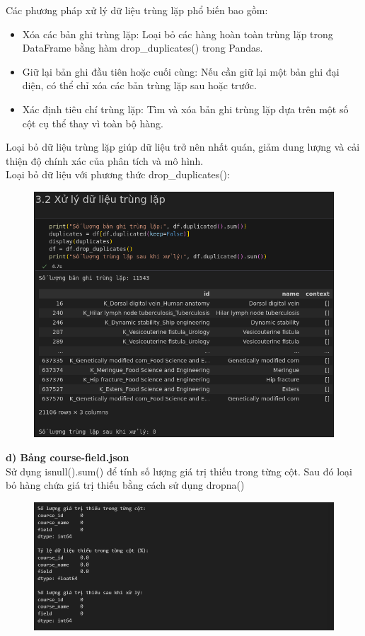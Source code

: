Các phương pháp xử lý dữ liệu trùng lặp phổ biến bao gồm:\\
\begin{itemize}
    \item Xóa các bản ghi trùng lặp: Loại bỏ các hàng hoàn toàn trùng lặp trong DataFrame bằng hàm drop\_duplicates() trong Pandas.
    \item Giữ lại bản ghi đầu tiên hoặc cuối cùng: Nếu cần giữ lại một bản ghi đại diện, có thể chỉ xóa các bản trùng lặp sau hoặc trước.
    \item Xác định tiêu chí trùng lặp: Tìm và xóa bản ghi trùng lặp dựa trên một số cột cụ thể thay vì toàn bộ hàng.
\end{itemize}
Loại bỏ dữ liệu trùng lặp giúp dữ liệu trở nên nhất quán, giảm dung lượng và cải thiện độ chính xác của phân tích và mô hình.\\
Loại bỏ dữ liệu với phương thức drop\_duplicates():
\newpage
\begin{figure}
    \centering
    \includegraphics[width=1\linewidth]{figures/47.png}
\end{figure}
\textbf{d) Bảng course-field.json}\\
Sử dụng isnull().sum() để tính số lượng giá trị thiếu trong từng cột. Sau đó loại bỏ hàng chứa giá trị thiếu bằng cách sử dụng dropna()
\newpage
\begin{figure}
    \centering
    \includegraphics[width=1\linewidth]{figures/48.png}
\end{figure}
